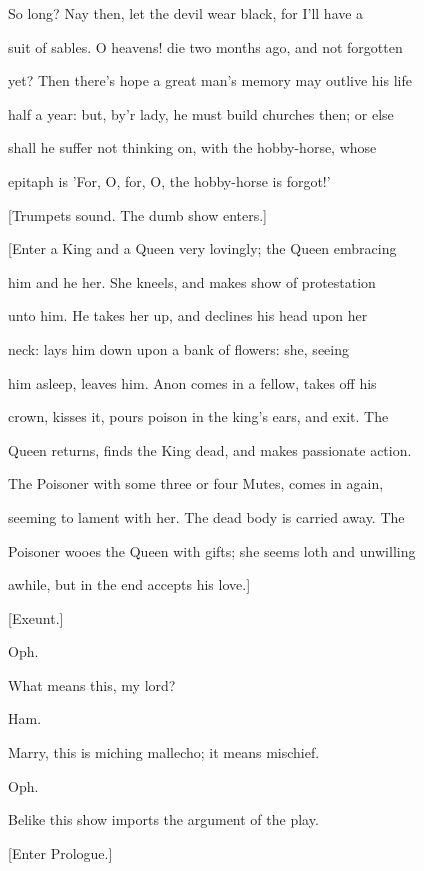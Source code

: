 \documentclass[12pt]{book}
\begin{document}
So long? Nay then, let the devil wear black, for I'll have a

suit of sables. O heavens! die two months ago, and not forgotten

yet? Then there's hope a great man's memory may outlive his life

half a year: but, by'r lady, he must build churches then; or else

shall he suffer not thinking on, with the hobby-horse, whose

epitaph is 'For, O, for, O, the hobby-horse is forgot!'



[Trumpets sound. The dumb show enters.]



[Enter a King and a Queen very lovingly; the Queen embracing

him and he her. She kneels, and makes show of protestation

unto him. He takes her up, and declines his head upon her

neck: lays him down upon a bank of flowers: she, seeing

him asleep, leaves him. Anon comes in a fellow, takes off his

crown, kisses it, pours poison in the king's ears, and exit. The

Queen returns, finds the King dead, and makes passionate action.

The Poisoner with some three or four Mutes, comes in again,

seeming to lament with her. The dead body is carried away. The

Poisoner wooes the Queen with gifts; she seems loth and unwilling

awhile, but in the end accepts his love.]



[Exeunt.]



Oph.

What means this, my lord?



Ham.

Marry, this is miching mallecho; it means mischief.



Oph.

Belike this show imports the argument of the play.



[Enter Prologue.]
\end{document}

